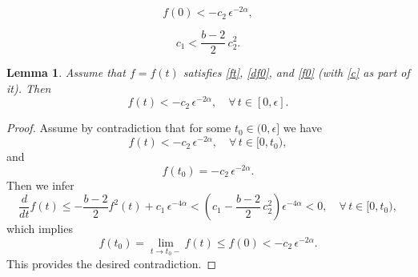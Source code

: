 \documentclass[10pt,a4paper]{amsart}
\newtheorem{lemma}{Lemma}
\begin{document}
\begin{equation}
f(0)< -c_2\,\epsilon^{-2\alpha}, \label{f0}
\end{equation}

\begin{equation}
c_1< \frac{b-2}{2}\,c_2^2.\label{c}
\end{equation}

\begin{lemma}
Assume that $f=f(t)$ satisfies \eqref{ft}, \eqref{df0}, and \eqref{f0} (with \eqref{c} as part of it). Then
\begin{equation}
f(t)< -c_2\,\epsilon^{-2\alpha}, \quad \forall\,t\in [0,\epsilon].\label{fce}
\end{equation}
\end{lemma}

\begin{proof}
Assume by contradiction that for some $t_0\in(0,\epsilon]$ we have
\[
f(t)< -c_2\,\epsilon^{-2\alpha}, \quad \forall\,t\in [0,t_0),
\] 
and 
\[
f(t_0)= -c_2\,\epsilon^{-2\alpha}.
\]
Then we infer
\[
\frac{d}{dt}f(t)\leq -\frac{b-2}{2}f^2(t) +c_1\,\epsilon^{-4\alpha}<(c_1-\frac{b-2}{2}\,c_2^2)\epsilon^{-4\alpha}<0, \quad \forall\,t\in [0,t_0),
\]
which implies
\[
f(t_0)=\lim_{t\to t_0-}f(t)\leq f(0)< -c_2\,\epsilon^{-2\alpha}.
\]
This provides the desired contradiction.
\end{proof}
\end{document}
